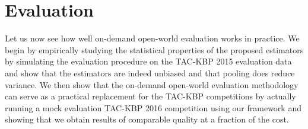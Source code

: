 \section{Evaluation}
\label{sec:evaluation}

Let us now see how well on-demand open-world evaluation works in practice.
We begin by empirically studying the statistical properties of the proposed estimators by simulating the evaluation procedure on the TAC-KBP 2015 evaluation data and show that the estimators are indeed unbiased and that pooling does reduce variance.
We then show that the on-demand open-world evaluation methodology can serve as a practical replacement for the TAC-KBP competitions by actually running a mock evaluation TAC-KBP 2016 competition using our framework and showing that we obtain results of comparable quality at a fraction of the cost.


